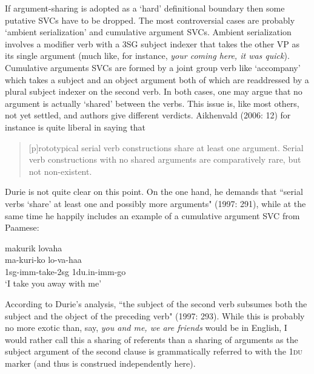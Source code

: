 If argument-sharing is adopted as a `hard' definitional boundary then some putative SVCs have to be dropped. The most controversial cases are probably `ambient serialization' and cumulative argument SVCs. Ambient serialization involves a modifier verb with a 3SG subject indexer that takes the other VP as its single argument (much like, for instance, \textit{your coming here, it was quick}). Cumulative arguments SVCs are formed by a joint group verb like `accompany' which takes a subject and an object argument both of which are readdressed by a plural subject indexer on the second verb. In both cases, one may argue that no argument is actually `shared' between the verbs. This issue is, like most others, not yet settled, and authors give different verdicts. Aikhenvald (2006: 12) for instance is quite liberal in saying that \begin{quote}[p]rototypical serial verb constructions share at least one argument. Serial verb constructions with no shared arguments are comparatively rare, but not non-existent.\end{quote}
Durie is not quite clear on this point. On the one hand, he demands that ``serial verbs `share' at least one and possibly more arguments" (1997: 291), while at the same time he happily includes an example of a cumulative argument SVC from Paamese:

\ea \label{}
\gll makurik lovaha \\
ma-kuri-ko lo-va-haa \\
\glc \acs{1}\acs{sg}-\acs{imm}-take-\acs{2}\acs{sg} \acs{1}\acs{du}.\acs{in}-\acs{imm}-go \\
\glft `I take you away with me' \\ 
\z
\xe

According to Durie's analysis, ``the subject of the second verb subsumes both the subject and the object of the preceding verb" (1997: 293). While this is probably no more exotic than, say, \textit{you and me, we are friends} would be in English, I would rather call this a sharing of referents than a sharing of arguments as the subject argument of the second clause is grammatically referred to with the 1\textsc{du} marker (and thus is construed independently here).


